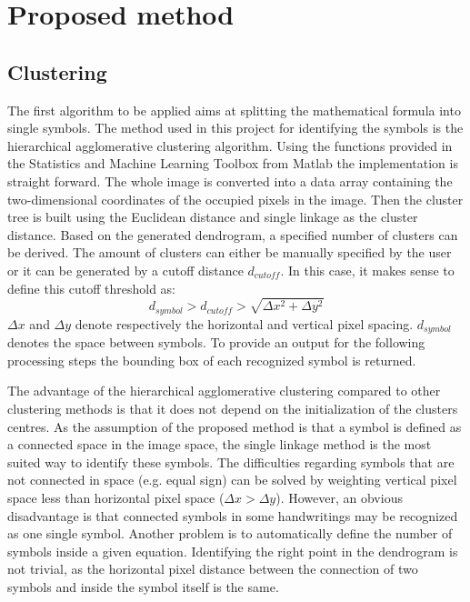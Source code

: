 \documentclass[twocolumn]{article}%
\begin{document}
	    
	\section{Proposed method}
	\subsection{Clustering}
		The first algorithm to be applied aims at splitting the mathematical formula into single symbols. The method used in this project for identifying the symbols is the hierarchical agglomerative clustering algorithm. Using the functions provided in the Statistics and Machine Learning Toolbox from Matlab \cite{sml_matlab} the implementation is straight forward. The whole image is converted into a data array containing the two-dimensional coordinates of the occupied pixels in the image. Then the cluster tree is built using the Euclidean distance and single linkage as the cluster distance. Based on the generated dendrogram, a specified number of clusters can be derived. The amount of clusters can either be manually specified by the user or it can be generated by a cutoff distance $d_{cutoff}$. In this case, it makes sense to define this cutoff threshold as:
		\begin{equation}
		d_{symbol} > d_{cutoff} > \sqrt{\Delta x^2 + \Delta y^2}
		\end{equation}
		$\Delta x$ and $\Delta y$ denote respectively the horizontal and vertical pixel spacing. $d_{symbol}$ denotes the space between symbols. To provide an output for the following processing steps the bounding box of each recognized symbol is returned.
		
			The advantage of the hierarchical agglomerative clustering compared to other clustering methods is that it does not depend on the initialization of the clusters centres. As the assumption of the proposed method is that a symbol is defined as a connected space in the image space, the single linkage method is the most suited way to identify these symbols. The difficulties regarding symbols that are not connected in space (e.g. equal sign) can be solved by weighting vertical pixel space less than horizontal pixel space ($\Delta x > \Delta y$). 
		However, an obvious disadvantage is that connected symbols in some handwritings may be recognized as one single symbol. Another problem is to automatically define the number of symbols inside a given equation. Identifying the right point in the dendrogram is not trivial, as the horizontal pixel distance between the connection of two symbols and inside the symbol itself is the same.
	
\end{document}
